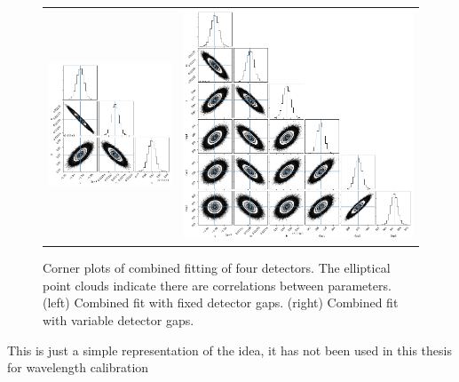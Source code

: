 \begin{figure}
    \centering
    \begin{tabular}{c c}
    \includegraphics[width=0.4\linewidth]{figures/appendix/fixed_quad_corner} & \includegraphics[width=0.45\linewidth]{figures/appendix/variable_quad_corner} \\
    \end{tabular}
    \caption[Multi-detector calibration parameter correlations.]{Corner plots of combined fitting of four detectors.
    The elliptical point clouds indicate there are correlations between parameters.
    (left) Combined fit with fixed detector gaps.
    (right) Combined fit with variable detector gaps.}
    \label{fig:quadcornerplots}
\end{figure}

This is just a simple representation of the idea, it has not been used in this thesis for wavelength calibration

